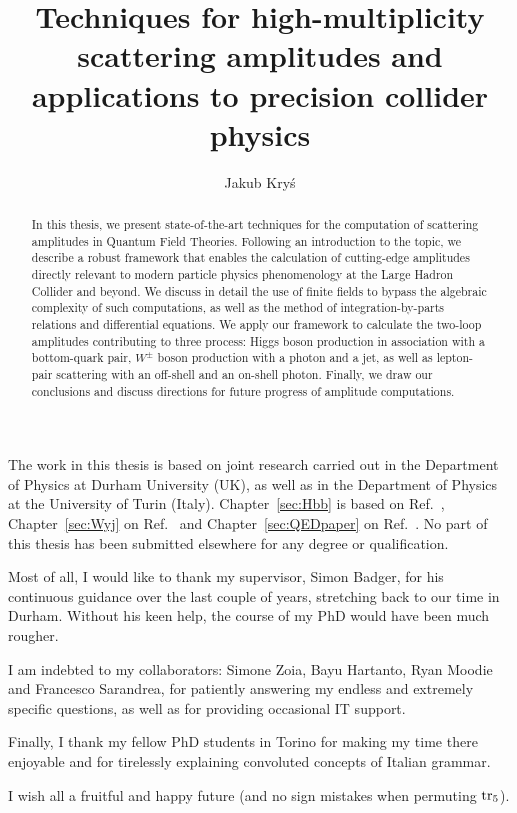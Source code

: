\documentclass[twoside,frontopenright,halfspacing, openany]{ip3thesis}
\begin{document}
\title{Techniques for high-multiplicity scattering amplitudes and applications to precision collider physics}
\author{Jakub Kry\'s}
\maketitlepage*

\begin{abstract}
%
	In this thesis, we present state-of-the-art techniques for the computation of scattering amplitudes in Quantum Field Theories. Following an introduction to the topic, we describe a robust framework that enables the calculation of cutting-edge amplitudes directly relevant to modern particle physics phenomenology at the Large Hadron Collider and beyond. We discuss in detail the use of finite fields to bypass the algebraic complexity of such computations, as well as the method of integration-by-parts relations and differential equations. We apply our framework to calculate the two-loop amplitudes contributing to three process: Higgs boson production in association with a bottom-quark pair, $W^\pm$ boson production with a photon and a jet, as well as lepton-pair scattering with an off-shell and an on-shell photon. Finally, we draw our conclusions and discuss directions for future progress of amplitude computations.
%
\end{abstract}

\disableprotrusion
\tableofcontents*
\enableprotrusion

\begin{declaration*}
%
	The work in this thesis is based on joint research carried out in the Department of Physics at Durham University (UK), as well as in the Department of Physics at the University of Turin (Italy). Chapter~\ref{sec:Hbb} is based on Ref.~\cite{Badger:2021ega}, Chapter~\ref{sec:Wyj} on Ref.~\cite{Badger:2022ncb} and Chapter~\ref{sec:QEDpaper} on Ref.~\cite{Badger:2023xtl}. No part of this thesis has been submitted elsewhere for any degree or qualification.  
%
\end{declaration*}

\begin{acknowledgements*}
%
	Most of all, I would like to thank my supervisor, Simon Badger, for his continuous guidance over the last couple of years, stretching back to our time in Durham. Without his keen help, the course of my PhD would have been much rougher.
 
    I am indebted to my collaborators: Simone Zoia, Bayu Hartanto, Ryan Moodie and Francesco Sarandrea, for patiently answering my endless and extremely specific questions, as well as for providing occasional IT support.
    
    Finally, I thank my fellow PhD students in Torino for making my time there enjoyable and for tirelessly explaining convoluted concepts of Italian grammar.
    
    I wish all a fruitful and happy future (and no sign mistakes when permuting $\operatorname{\rm tr}_5$).
%
\end{acknowledgements*}
\end{document}
